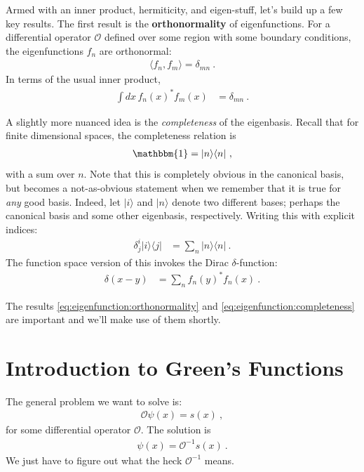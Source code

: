 \documentclass[12pt]{article}
\numberwithin{equation}{section}    %
\begin{document}
Armed with an inner product, hermiticity, and eigen-stuff, let’s build up a few key results. The first result is the \textbf{orthonormality} of eigenfunctions. For a differential operator $\mathcal O$ defined over some region with some boundary conditions, the eigenfunctions $f_n$ are orthonormal:
\begin{align}
  \langle f_n, f_m \rangle = \delta_{mn} \ .
\end{align}
In terms of the usual inner product,
\begin{align}
  \int dx \, f_n(x)^* f_m(x) &= \delta_{mn} \ .
  \label{eq:eigenfunction:orthonormality}
\end{align}

A slightly more nuanced idea is the \emph{completeness} of the eigenbasis. Recall that for finite dimensional spaces, the completeness relation is 
\begin{align}
  \mathbbm{1} = |n\rangle \langle n| \ ,
\end{align}
with a sum over $n$. Note that this is completely obvious in the canonical basis, but becomes a not-as-obvious statement when we remember that it is true for \emph{any} good basis. Indeed, let $|i\rangle$ and $|n\rangle$ denote two different bases; perhaps the canonical basis and some other eigenbasis, respectively. Writing this with explicit indices:
\begin{align}
  \delta^i_j |i\rangle\langle j| &= \sum_n |n\rangle \langle n| \ .
\end{align}
The function space version of this invokes the Dirac $\delta$-function:
\begin{align}
  \delta(x-y) &= \sum_n f_n(y)^* f_n(x) \ .
  \label{eq:eigenfunction:completeness}
\end{align}

The results \eqref{eq:eigenfunction:orthonormality} and \eqref{eq:eigenfunction:completeness} are important and we’ll make use of them shortly. 








\section{Introduction to Green’s Functions}

The general problem we want to solve is:
\begin{align}
  \mathcal O \psi(x) = s(x) \ , 
\end{align}
for some differential operator $\mathcal{O}$. The solution is
\begin{align}
  \psi(x) = \mathcal O^{-1} s(x) \ .
\end{align}
We just have to figure out what the heck $\mathcal O^{-1}$ means. 
\end{document}
